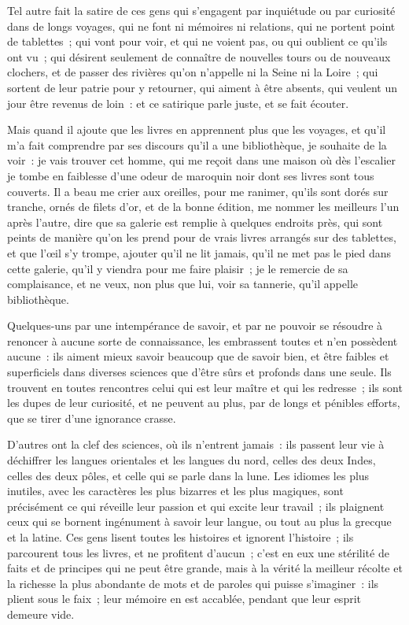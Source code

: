 \documentclass[french,twoside]{book} %
\begin{document}
Tel autre fait la satire de ces gens qui s’engagent par inquiétude ou par curiosité dans de longs voyages, qui ne font ni mémoires ni relations, qui ne portent point de tablettes ; qui vont pour voir, et qui ne voient pas, ou qui oublient ce qu’ils ont vu ; qui désirent seulement de connaître de nouvelles tours ou de nouveaux clochers, et de passer des rivières qu’on n’appelle ni la Seine ni la Loire ; qui sortent de leur patrie pour y retourner, qui aiment à être absents, qui veulent un jour être revenus de loin : et ce satirique parle juste, et se fait écouter.\par
Mais quand il ajoute que les livres en apprennent plus que les voyages, et qu’il m’a fait comprendre par ses discours qu’il a une bibliothèque, je souhaite de la voir : je vais trouver cet homme, qui me reçoit dans une maison où dès l’escalier je tombe en faiblesse d’une odeur de maroquin noir dont ses livres sont tous couverts. Il a beau me crier aux oreilles, pour me ranimer, qu’ils sont dorés sur tranche, ornés de filets d’or, et de la bonne édition, me nommer les meilleurs l’un après l’autre, dire que sa galerie est remplie à quelques endroits près, qui sont peints de manière qu’on les prend pour de vrais livres arrangés sur des tablettes, et que l’œil s’y trompe, ajouter qu’il ne lit jamais, qu’il ne met pas le pied dans cette galerie, qu’il y viendra pour me faire plaisir ; je le remercie de sa complaisance, et ne veux, non plus que lui, voir sa tannerie, qu’il appelle bibliothèque.\par
Quelques-uns par une intempérance de savoir, et par ne pouvoir se résoudre à renoncer à aucune sorte de connaissance, les embrassent toutes et n’en possèdent aucune : ils aiment mieux savoir beaucoup que de savoir bien, et être faibles et superficiels dans diverses sciences que d’être sûrs et profonds dans une seule. Ils trouvent en toutes rencontres celui qui est leur maître et qui les redresse ; ils sont les dupes de leur curiosité, et ne peuvent au plus, par de longs et pénibles efforts, que se tirer d’une ignorance crasse.\par
D'autres ont la clef des sciences, où ils n’entrent jamais : ils passent leur vie à déchiffrer les langues orientales et les langues du nord, celles des deux Indes, celles des deux pôles, et celle qui se parle dans la lune. Les idiomes les plus inutiles, avec les caractères les plus bizarres et les plus magiques, sont précisément ce qui réveille leur passion et qui excite leur travail ; ils plaignent ceux qui se bornent ingénument à savoir leur langue, ou tout au plus la grecque et la latine. Ces gens lisent toutes les histoires et ignorent l’histoire ; ils parcourent tous les livres, et ne profitent d’aucun ; c’est en eux une stérilité de faits et de principes qui ne peut être grande, mais à la vérité la meilleur récolte et la richesse la plus abondante de mots et de paroles qui puisse s’imaginer : ils plient sous le faix ; leur mémoire en est accablée, pendant que leur esprit demeure vide.\par
\end{document}
